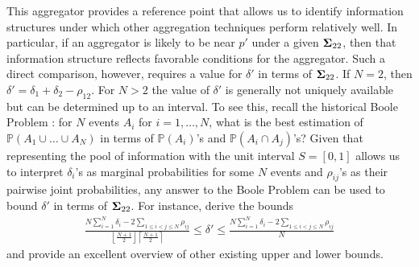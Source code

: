 \documentclass[12pt]{article}
\renewcommand{\P}{\mathbb{P}}
\theoremstyle{definition}
\theoremstyle{definition}
\def\P{{\mathbb P}}
\begin{document}
This aggregator provides a reference point that allows us to identify information structures under which other aggregation techniques perform relatively well. In particular, if an aggregator is likely to be near $p'$ under a given ${\bf\Sigma}_{22}$, then that information structure reflects favorable conditions for the aggregator. Such a direct comparison, however, requires a value for $\delta'$ in terms of ${\bf\Sigma}_{22}$. If $N = 2$, then $\delta' = \delta_1 + \delta_2 - \rho_{12}$. For $N > 2$ the value of $\delta'$ is generally not uniquely available but can be determined up to an interval. To see this, recall the historical Boole Problem \citep{boole1854investigation}: for $N$ events $A_i$ for $i = 1, \dots, N$, what is the best estimation of $\P(A_1 \cup \dots \cup A_N)$ in terms of $\P(A_i)$'s and $\P(A_i \cap A_j)$'s?
Given that representing the pool of information with the unit interval $S = [0,1]$ allows us to interpret $\delta_i$'s as marginal probabilities for some $N$ events and $\rho_{ij}$'s as their pairwise joint probabilities, any answer to the Boole Problem can be used to bound $\delta'$ in terms of ${\bf\Sigma}_{22}$. For instance, \cite{deza1997geometry} derive the bounds
\begin{align*}
\frac{N \sum_{i=1}^N \delta_i - 2 \sum_{1 \leq i < j \leq N} \rho_{ij}}{\left\lfloor \frac{N+1}{2} \right\rfloor \left\lceil \frac{N+1}{2} \right\rceil }  \leq \delta' \leq \frac{N \sum_{i=1}^N \delta_i - 2 \sum_{1 \leq i < j \leq N} \rho_{ij}}{N} 
\end{align*}
and provide an excellent overview of other existing upper and lower bounds. 
\end{document}
